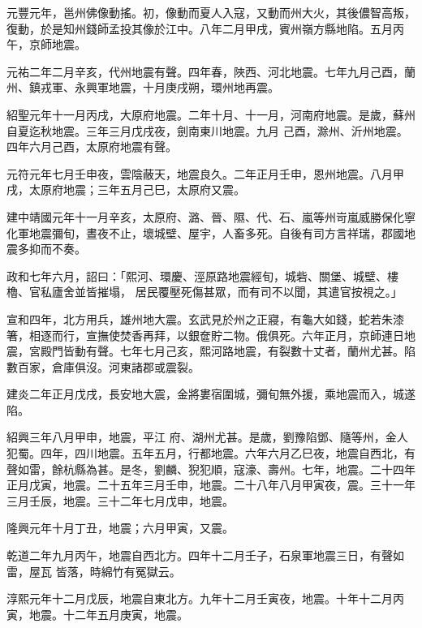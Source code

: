 \begin{pinyinscope}
 元豐元年，邕州佛像動搖。初，像動而夏人入寇，又動而州大火，其後儂智高叛，復動，於是知州錢師孟投其像於江中。八年二月甲戌，賓州嶺方縣地陷。五月丙午，京師地震。



 元祐二年二月辛亥，代州地震有聲。四年春，陜西、河北地震。七年九月己酉，蘭州、鎮戎軍、永興軍地震，十月庚戌朔，環州地再震。



 紹聖元年十一月丙戌，大原府地震。二年十月、十一月，河南府地震。是歲，蘇州自夏迄秋地震。三年三月戊戌夜，劍南東川地震。九月
 己酉，滁州、沂州地震。四年六月己酉，太原府地震有聲。



 元符元年七月壬申夜，雲陰蔽天，地震良久。二年正月壬申，恩州地震。八月甲戌，太原府地震；三年五月己巳，太原府又震。



 建中靖國元年十一月辛亥，太原府、潞、晉、隰、代、石、嵐等州岢嵐威勝保化寧化軍地震彌旬，晝夜不止，壞城壁、屋宇，人畜多死。自後有司方言祥瑞，郡國地震多抑而不奏。



 政和七年六月，詔曰：「熙河、環慶、涇原路地震經旬，城砦、關堡、城壁、樓櫓、官私廬舍並皆摧塌，
 居民覆壓死傷甚眾，而有司不以聞，其遣官按視之。」



 宣和四年，北方用兵，雄州地大震。玄武見於州之正寢，有龜大如錢，蛇若朱漆箸，相逐而行，宣撫使焚香再拜，以銀奩貯二物。俄俱死。六年正月，京師連日地震，宮殿門皆動有聲。七年七月己亥，熙河路地震，有裂數十丈者，蘭州尤甚。陷數百家，倉庫俱沒。河東諸郡或震裂。



 建炎二年正月戊戌，長安地大震，金將婁宿圍城，彌旬無外援，乘地震而入，城遂陷。



 紹興三年八月甲申，地震，平江
 府、湖州尤甚。是歲，劉豫陷鄧、隨等州，金人犯蜀。四年，四川地震。五年五月，行都地震。六年六月乙巳夜，地震自西北，有聲如雷，餘杭縣為甚。是冬，劉麟、猊犯順，寇濠、壽州。七年，地震。二十四年正月戊寅，地震。二十五年三月壬申，地震。二十八年八月甲寅夜，震。三十一年三月壬辰，地震。三十二年七月戊申，地震。



 隆興元年十月丁丑，地震；六月甲寅，又震。



 乾道二年九月丙午，地震自西北方。四年十二月壬子，石泉軍地震三日，有聲如雷，屋瓦
 皆落，時綿竹有冤獄云。



 淳熙元年十二月戊辰，地震自東北方。九年十二月壬寅夜，地震。十年十二月丙寅，地震。十二年五月庚寅，地震。




\end{pinyinscope}
